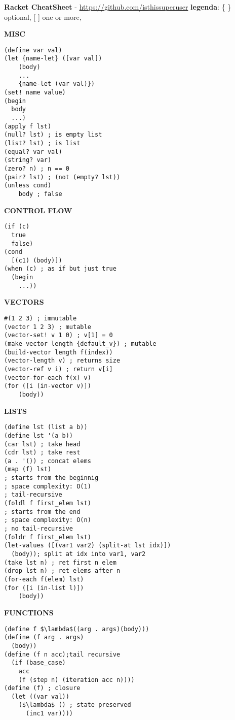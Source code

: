 \documentclass{article}
\begin{document}
\textbf{Racket CheatSheet} - \href{https://github.com/isthissuperuser}{https://github.com/isthissuperuser} \textbar{ }  \textbf{legenda}: \{ \} optional, [ ] one or more, 
\begin{multicols*}{3}

\hrulefill

\textbf{MISC}
\begin{lstlisting}
(define var val)
(let {name-let} ([var val]) 
    (body)
    ...
    {name-let (var val)})
(set! name value)
(begin
  body
  ...)
(apply f lst)
(null? lst) ; is empty list
(list? lst) ; is list
(equal? var val)
(string? var)
(zero? n) ; n == 0
(pair? lst) ; (not (empty? lst))
(unless cond)
    body ; false
\end{lstlisting}

\hrulefill

\textbf{CONTROL FLOW}
\begin{lstlisting}
(if (c)
  true
  false)
(cond 
  [(c1) (body)])
(when (c) ; as if but just true
  (begin
    ...))
\end{lstlisting}

\hrulefill

\textbf{VECTORS}
\begin{lstlisting}
#(1 2 3) ; immutable
(vector 1 2 3) ; mutable
(vector-set! v 1 0) ; v[1] = 0
(make-vector length {default_v}) ; mutable
(build-vector length f(index))
(vector-length v) ; returns size
(vector-ref v i) ; return v[i]
(vector-for-each f(x) v)
(for ([i (in-vector v)])
    (body))
\end{lstlisting}

\hrulefill

\textbf{LISTS}
\begin{lstlisting}
(define lst (list a b))
(define lst '(a b))
(car lst) ; take head
(cdr lst) ; take rest
(a . '()) ; concat elems
(map (f) lst)
; starts from the beginnig
; space complexity: O(1)
; tail-recursive
(foldl f first_elem lst)
; starts from the end
; space complexity: O(n)
; no tail-recursive
(foldr f first_elem lst)
(let-values ([(var1 var2) (split-at lst idx)])
  (body)); split at idx into var1, var2
(take lst n) ; ret first n elem
(drop lst n) ; ret elems after n
(for-each f(elem) lst)
(for ([i (in-list l)])
    (body))
\end{lstlisting}

\hrulefill

\textbf{FUNCTIONS}
\begin{lstlisting}
(define f $\lambda$((arg . args)(body)))
(define (f arg . args)
  (body))
(define (f n acc);tail recursive
  (if (base_case)
    acc
    (f (step n) (iteration acc n))))
(define (f) ; closure
  (let ((var val))
    ($\lambda$ () ; state preserved
      (inc1 var)))) 
\end{lstlisting}


\end{multicols*}
\end{document}

